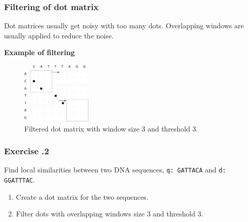 \subsubsection*{Filtering of dot matrix}
Dot matrices usually get noisy with too many dots.  Overlapping windows are usually applied to reduce the noise.

\bigskip 
\noindent
\textbf{Example of filtering}

\begin{figure}[H]
  \centering
      \includegraphics[width=0.3\textwidth]{fig04/dot_matrix_filtered.png}
  \caption{Filtered dot matrix with window size 3 and threshold 3.}
\end{figure}

%
%
\subsubsection*{Exercise \thesection.2}
Find local similarities between two DNA sequences, \verb|q: GATTACA| and \verb|d: GGATTTAC|.

\begin{enumerate}
\item Create a dot matrix for the two sequences.
\item Filter dots with overlapping windows size 3 and threshold 3.
\end{enumerate}

\bigskip 

%
